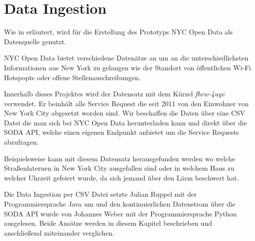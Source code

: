 \section{Data Ingestion}

Wie in  erläutert, wird für die Erstellung des Prototyps NYC Open Data als Datenquelle genutzt.

NYC Open Data bietet verschiedene Datenätze an um an die unterschiedlichsten Informationen aus New York zu gelangen
wie \zb{} der Standort von öffentlichen Wi-Fi Hotspopts oder offene Stellenauschreibungen.\autocite{NYCOpenDataExample}

Innerhalb dieses Projektes wird der Datensatz mit dem Kürzel \textit{fhrw-4uyv} verwendet.
Er beinhält alle Service Request die seit 2011 von den Einwohner von New York City abgesetzt worden sind. Wir beschaffen die Daten über eine \ac{CSV} Datei die man sich bei NYC Open Data herunterladen kann und direkt über die \ac{SODA} \ac{API}, welche einen eigenen Endpunkt anbietet um die Service Requests abzufragen.

Beispielsweise kann mit diesem Datensatz herausgefunden werden wo welche Straßenlaternen in New York City ausgefallen sind
oder in welchem Haus zu welcher Uhrzeit gefeiert wurde, da sich jemand über den Lärm beschwert hat.



Die Data Ingestion per \ac{CSV} Datei setzte Julian Ruppel mit der Programmiersprache Java um und
den kontinuierlichen Datenstrom über die \ac{SODA} \ac{API} wurde von Johannes Weber mit der Programmiersprache Python
ausgelesen. Beide Ansätze werden in diesem Kapitel beschrieben und anschließend miteinander verglichen.



